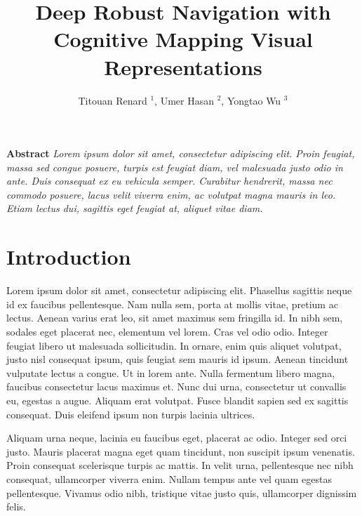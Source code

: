 \documentclass{cta-author}
\begin{document}
\title{Deep Robust Navigation with Cognitive Mapping Visual Representations}

\author{Titouan Renard $^1$, Umer Hasan $^2$, Yongtao Wu $^3$}

\address{
}
\maketitle








\textbf{Abstract}
\textit{Lorem ipsum dolor sit amet, consectetur adipiscing elit. Proin feugiat, massa sed congue posuere, turpis est feugiat diam, vel malesuada justo odio in ante. Duis consequat ex eu vehicula semper. Curabitur hendrerit, massa nec commodo posuere, lacus velit viverra enim, ac volutpat magna mauris in leo. Etiam lectus dui, sagittis eget feugiat at, aliquet vitae diam.}

\section{Introduction}



Lorem ipsum dolor sit amet, consectetur adipiscing elit. Phasellus sagittis neque id ex faucibus pellentesque. Nam nulla sem, porta at mollis vitae, pretium ac lectus. Aenean varius erat leo, sit amet maximus sem fringilla id. In nibh sem, sodales eget placerat nec, elementum vel lorem. Cras vel odio odio. Integer feugiat libero ut malesuada sollicitudin. In ornare, enim quis aliquet volutpat, justo nisl consequat ipsum, quis feugiat sem mauris id ipsum. Aenean tincidunt vulputate lectus a congue. Ut in lorem ante. Nulla fermentum libero magna, faucibus consectetur lacus maximus et. Nunc dui urna, consectetur ut convallis eu, egestas a augue. Aliquam erat volutpat. Fusce blandit sapien sed ex sagittis consequat. Duis eleifend ipsum non turpis lacinia ultrices.

Aliquam urna neque, lacinia eu faucibus eget, placerat ac odio. Integer sed orci justo. Mauris placerat magna eget quam tincidunt, non suscipit ipsum venenatis. Proin consequat scelerisque turpis ac mattis. In velit urna, pellentesque nec nibh consequat, ullamcorper viverra enim. Nullam tempus ante vel quam egestas pellentesque. Vivamus odio nibh, tristique vitae justo quis, ullamcorper dignissim felis.
\end{document}
